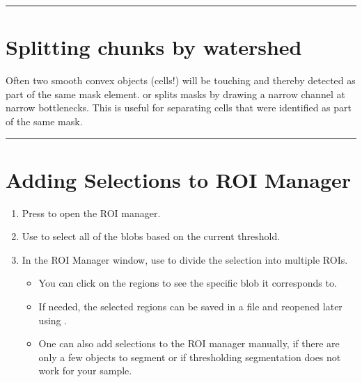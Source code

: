 \documentclass[letterpaper,10pt,english]{jupyterBook}
\begin{document}
\sphinxAtStartPar
{}


\bigskip\hrule\bigskip



\section{Splitting chunks by watershed}
\label{\detokenize{basic-segmentation:splitting-chunks-by-watershed}}
\sphinxAtStartPar
Often two smooth convex objects (cells!) will be touching and thereby detected as part of the same mask element.  or  splits masks by drawing a narrow channel at narrow bottlenecks. This is useful for separating cells that were identified as part of the same mask.

\sphinxAtStartPar
{}


\bigskip\hrule\bigskip



\section{Adding Selections to ROI Manager}
\label{\detokenize{basic-segmentation:adding-selections-to-roi-manager}}\begin{enumerate}
%
\item {} 
\sphinxAtStartPar
Press  to open the ROI manager.

\item {} 
\sphinxAtStartPar
Use  to select all of the blobs based on the current threshold.

\item {} 
\sphinxAtStartPar
In the ROI Manager window, use  to divide the selection into multiple ROIs.
\begin{itemize}
\item {} 
\sphinxAtStartPar
You can click on the regions to see the specific blob it corresponds to.

\item {} 
\sphinxAtStartPar
If needed, the selected regions can be saved in a file and reopened later using .

\item {} 
\sphinxAtStartPar
One can also add selections to the ROI manager manually, if there are only a few objects to segment or if thresholding segmentation does not work for your sample.

\end{itemize}

\end{enumerate}
\end{document}
